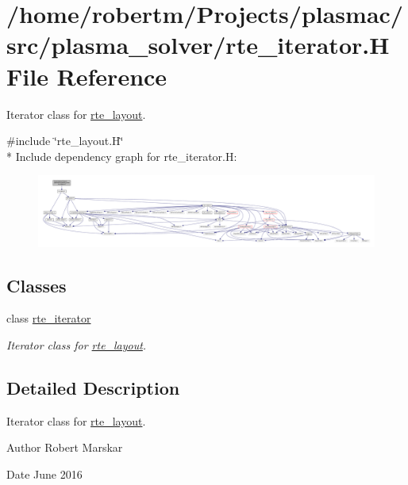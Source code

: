 \hypertarget{rte__iterator_8H}{}\section{/home/robertm/\+Projects/plasmac/src/plasma\+\_\+solver/rte\+\_\+iterator.H File Reference}
\label{rte__iterator_8H}


Iterator class for \hyperlink{classrte__layout}{rte\+\_\+layout}.  


{\ttfamily \#include \char`\"{}rte\+\_\+layout.\+H\char`\"{}}\\*
Include dependency graph for rte\+\_\+iterator.\+H\+:\nopagebreak
\begin{figure}[H]
\begin{center}
\leavevmode
\includegraphics[width=350pt]{rte__iterator_8H__incl}
\end{center}
\end{figure}
\subsection*{Classes}
\begin{DoxyCompactItemize}
\item 
class \hyperlink{classrte__iterator}{rte\+\_\+iterator}
\begin{DoxyCompactList}\small\item\em Iterator class for \hyperlink{classrte__layout}{rte\+\_\+layout}. \end{DoxyCompactList}\end{DoxyCompactItemize}


\subsection{Detailed Description}
Iterator class for \hyperlink{classrte__layout}{rte\+\_\+layout}. 

\begin{DoxyAuthor}{Author}
Robert Marskar 
\end{DoxyAuthor}
\begin{DoxyDate}{Date}
June 2016 
\end{DoxyDate}
